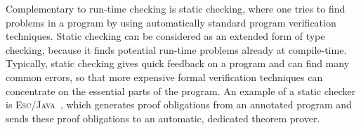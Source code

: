 \documentclass[a4paper]{llncs}
\newcommand{\escj}{\textsc{Esc/Java}}
\newcommand{\jass}{\textsc{Jass}}
\newcommand{\cPP}{\texttt{C/C}\nolinebreak\hspace{-.05em}\raisebox{.4ex}{\tiny\bf
+}\nolinebreak\hspace{-.10em}\raisebox{.4ex}{\tiny\bf +}}
\begin{document}




Complementary to run-time checking is static checking, where one tries
to find problems in a program by using automatically standard program
verification techniques. Static checking can be considered as an
extended form of type checking, because it finds potential run-time
problems already at compile-time. Typically, static checking gives
quick feedback on a program and can find many common errors, so that
more expensive formal verification techniques can concentrate on the
essential parts of the program. An example of a static checker is
\escj~\cite{LeinoNS00}, which generates proof obligations from an
annotated program and sends these proof obligations to an automatic,
dedicated theorem prover.  



\end{document}
